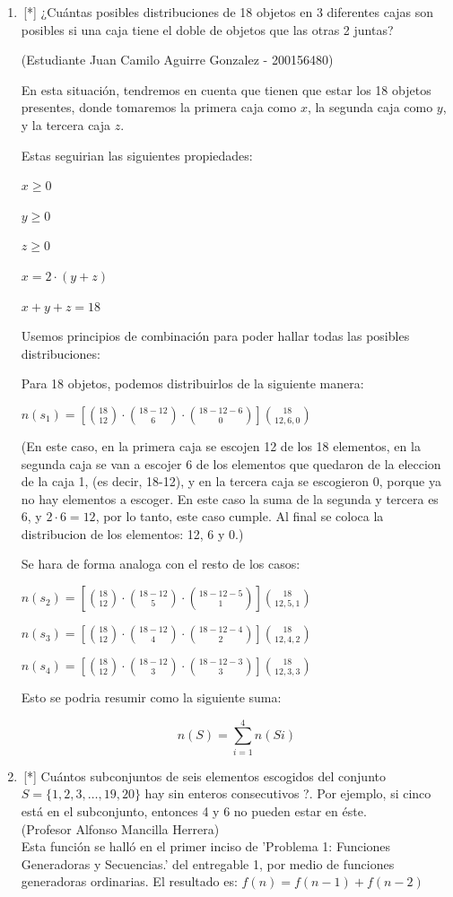 \begin{enumerate}
\item \,[*] ¿Cuántas posibles distribuciones de 18 objetos en 3 diferentes cajas son posibles si una caja tiene el doble de objetos que las otras 2 juntas?

(Estudiante Juan Camilo Aguirre Gonzalez - 200156480)

En esta situación, tendremos en cuenta que tienen que estar los 18 objetos presentes, donde tomaremos la primera caja como $x$, la segunda caja como $y$, y la tercera caja $z$.

Estas seguirian las siguientes propiedades:

$x\ge0$

$y\ge0$

$z\ge0$

$x=2\cdot(y+z)$

$x+y+z=18$

Usemos principios de combinación para poder hallar todas las posibles distribuciones:

Para 18 objetos, podemos distribuirlos de la siguiente manera:

$n(s_1)=[\binom{18}{12}\cdot \binom{18-12}{6} \cdot \binom{18-12-6}{0}]\binom{18}{12,6,0}$

(En este caso, en la primera caja se escojen 12 de los 18 elementos, en la segunda caja se van a escojer 6 de los elementos que quedaron de la eleccion de la caja 1, (es decir, 18-12), y en la tercera caja se escogieron 0, porque ya no hay elementos a escoger. En este caso la suma de la segunda y tercera es 6, y $2\cdot 6 = 12$, por lo tanto, este caso cumple. Al final se coloca la distribucion de los elementos: 12, 6 y 0.)

Se hara de forma analoga con el resto de los casos:


$n(s_2)=[\binom{18}{12}\cdot \binom{18-12}{5} \cdot \binom{18-12-5}{1}]\binom{18}{12,5,1}$

$n(s_3)=[\binom{18}{12}\cdot \binom{18-12}{4} \cdot \binom{18-12-4}{2}]\binom{18}{12,4,2}$

$n(s_4)=[\binom{18}{12}\cdot \binom{18-12}{3} \cdot \binom{18-12-3}{3}]\binom{18}{12,3,3}$

Esto se podria resumir como la siguiente suma:

$$n(S)=\sum_{i=1}^{4} n(Si)$$

\item \,[*] Cuántos subconjuntos de seis elementos escogidos del conjunto  $S=\{1, 2, 3, \dots, 19, 20\}$ hay sin enteros consecutivos ?. Por ejemplo, si cinco está en el subconjunto, entonces 4 y 6 no pueden estar en éste.\\
(Profesor Alfonso Mancilla Herrera)\\
Esta función se halló en el primer inciso de 'Problema 1: Funciones Generadoras y Secuencias.' del entregable 1, por medio de funciones generadoras ordinarias. El resultado es: $f(n)=f(n-1)+f(n-2)$ \\


\end{enumerate}
